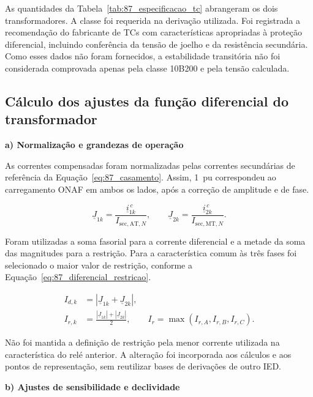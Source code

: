 As quantidades da Tabela~\ref{tab:87_especificacao_tc} abrangeram os dois transformadores. A classe foi requerida na derivação utilizada. Foi registrada a recomendação do fabricante de TCs com características apropriadas à proteção diferencial, incluindo conferência da tensão de joelho e da resistência secundária. Como esses dados não foram fornecidos, a estabilidade transitória não foi considerada comprovada apenas pela classe 10B200 e pela tensão calculada.

\subsection{Cálculo dos ajustes da função diferencial do transformador}

\textbf{a) Normalização e grandezas de operação}

As correntes compensadas foram normalizadas pelas correntes secundárias de referência da Equação~\eqref{eq:87_casamento}. Assim, 1~pu correspondeu ao carregamento ONAF em ambos os lados, após a correção de amplitude e de fase.

\begin{equation}
    \underline{J}_{1k}=\frac{\underline{i}_{1k}^{\,c}}
    {I_{\mathrm{sec,AT},N}},
    \qquad
    \underline{J}_{2k}=\frac{\underline{i}_{2k}^{\,c}}
    {I_{\mathrm{sec,MT},N}}.
    \label{eq:87_normalizacao}
\end{equation}

Foram utilizadas a soma fasorial para a corrente diferencial e a metade da soma das magnitudes para a restrição. Para a característica comum às três fases foi selecionado o maior valor de restrição, conforme a Equação~\eqref{eq:87_diferencial_restricao}.

\begin{equation}
    \begin{aligned}
        I_{d,k}&=|\underline{J}_{1k}+\underline{J}_{2k}|,\\
        I_{r,k}&=\frac{|\underline{J}_{1k}|+|\underline{J}_{2k}|}{2},
        \qquad I_r=\max(I_{r,A},I_{r,B},I_{r,C}).
    \end{aligned}
    \label{eq:87_diferencial_restricao}
\end{equation}

Não foi mantida a definição de restrição pela menor corrente utilizada na característica do relé anterior. A alteração foi incorporada aos cálculos e aos pontos de representação, sem reutilizar bases de derivações de outro IED.

\textbf{b) Ajustes de sensibilidade e declividade}

